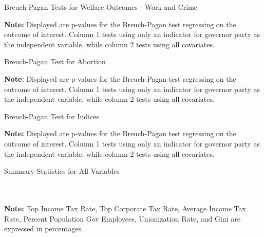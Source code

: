 \documentclass{article}
\begin{document}
\begin{table}[!hbtp]
\caption{Breuch-Pagan Tests for Welfare Outcomes - Work and Crime}

\textbf{Note:} Displayed are p-values for the Breuch-Pagan test regressing on the outcome of interest. Column 1 tests using only an indicator for governor party as the independent variable, while column 2 tests using all covariates. 
\label{table:bp_welfare2}
\end{table}

\begin{table}[!hbtp]
\caption{Breuch-Pagan Test for Abortion}

\textbf{Note:} Displayed are p-values for the Breuch-Pagan test regressing on the outcome of interest. Column 1 tests using only an indicator for governor party as the independent variable, while column 2 tests using all covariates. 
\label{table:bp_abortion}
\end{table}

\begin{table}[!hbtp]
\caption{Breuch-Pagan Test for Indices}

\textbf{Note:} Displayed are p-values for the Breuch-Pagan test regressing on the outcome of interest. Column 1 tests using only an indicator for governor party as the independent variable, while column 2 tests using all covariates. 
\label{table:bp_index}
\end{table}


\begin{table}[!hbtp]
\caption{Summary Statistics for All Variables}

\\ \\
\textbf{Note:}  Top Income Tax Rate, Top Corporate Tax Rate, Average Income Tax Rate, Percent Population  Gov Employees, Unionization Rate, and Gini are expressed in percentages.
\label{table:summary_long}
\end{table}
\end{document}
